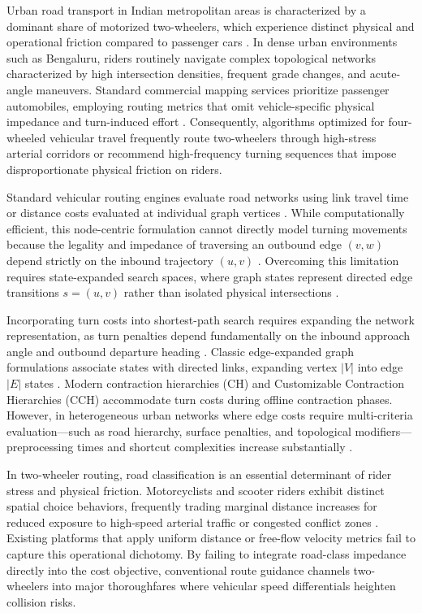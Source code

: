 \documentclass[conference]{IEEEtran}
\begin{document}
Urban road transport in Indian metropolitan areas is characterized by a dominant share of motorized two-wheelers, which experience distinct physical and operational friction compared to passenger cars \cite{promraksa2022lane,kotagi2020modeling}. In dense urban environments such as Bengaluru, riders routinely navigate complex topological networks characterized by high intersection densities, frequent grade changes, and acute-angle maneuvers. Standard commercial mapping services prioritize passenger automobiles, employing routing metrics that omit vehicle-specific physical impedance and turn-induced effort \cite{kumar2025realtime}. Consequently, algorithms optimized for four-wheeled vehicular travel frequently route two-wheelers through high-stress arterial corridors or recommend high-frequency turning sequences that impose disproportionate physical friction on riders.

Standard vehicular routing engines evaluate road networks using link travel time or distance costs evaluated at individual graph vertices \cite{luxen2011realtime}. While computationally efficient, this node-centric formulation cannot directly model turning movements because the legality and impedance of traversing an outbound edge $(v, w)$ depend strictly on the inbound trajectory $(u, v)$ \cite{das2019modeling,winter2002modeling}. Overcoming this limitation requires state-expanded search spaces, where graph states represent directed edge transitions $s=(u, v)$ rather than isolated physical intersections \cite{kirby1969minimum}.

Incorporating turn costs into shortest-path search requires expanding the network representation, as turn penalties depend fundamentally on the inbound approach angle and outbound departure heading \cite{winter2002modeling}. Classic edge-expanded graph formulations associate states with directed links, expanding vertex $|V|$ into edge $|E|$ states \cite{kirby1969minimum}. Modern contraction hierarchies (CH) \cite{geisberger2011efficient} and Customizable Contraction Hierarchies (CCH) \cite{bast2016route} accommodate turn costs during offline contraction phases. However, in heterogeneous urban networks where edge costs require multi-criteria evaluation---such as road hierarchy, surface penalties, and topological modifiers---preprocessing times and shortcut complexities increase substantially \cite{bast2016route}.

In two-wheeler routing, road classification is an essential determinant of rider stress and physical friction. Motorcyclists and scooter riders exhibit distinct spatial choice behaviors, frequently trading marginal distance increases for reduced exposure to high-speed arterial traffic or congested conflict zones \cite{fadilah2024identifying,asvial2020entropy}. Existing platforms that apply uniform distance or free-flow velocity metrics fail to capture this operational dichotomy. By failing to integrate road-class impedance directly into the cost objective, conventional route guidance channels two-wheelers into major thoroughfares where vehicular speed differentials heighten collision risks.
\end{document}
